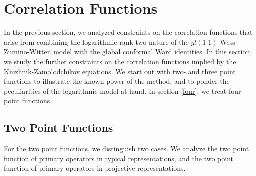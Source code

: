 \documentclass[12pt]{article}
\numberwithin{equation}{section}
\numberwithin{equation}{section}
\numberwithin{table}{section}\setlength{\multlinegap}{25pt}
\begin{document}
\section{Correlation Functions}
\label{correlatorsKZ} 
In the previous section, we analyzed  constraints on the correlation functions that arise from combining the logarithmic
rank two nature of the $gl(1|1)$ Wess-Zumino-Witten model with the global conformal Ward identities. In this section, we study
 the further constraints on the correlation functions implied by the Knizhnik-Zamolodchikov equations. We start out with
two- and three point functions to illustrate the known power of the method, and to ponder the peculiarities of the logarithmic
model at hand. In section \ref{four}, we treat four point functions.


\subsection{Two Point Functions}
For the two point functions, we distinguish two cases. We analyze the two point function of primary operators in typical 
representations, and the two point function of primary operators in projective representations.
\end{document}
